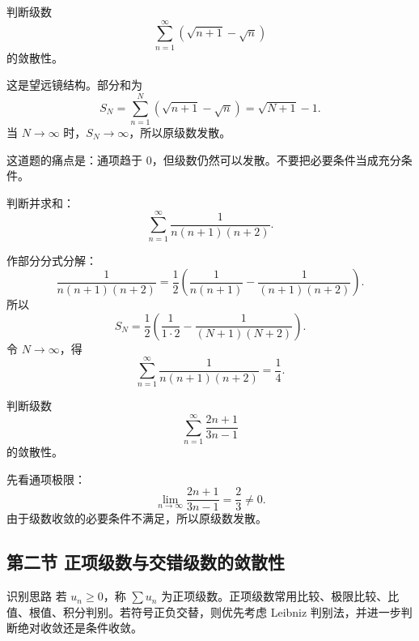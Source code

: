 \begin{problem}
判断级数
\[
  \sum_{n=1}^{\infty}\left(\sqrt{n+1}-\sqrt n\right)
\]
的敛散性。
\end{problem}
\begin{solution}
这是望远镜结构。部分和为
\[
  S_N=\sum_{n=1}^{N}\left(\sqrt{n+1}-\sqrt n\right)=\sqrt{N+1}-1.
\]
当 $N\to\infty$ 时，$S_N\to\infty$，所以原级数发散。
\end{solution}
\begin{note}
这道题的痛点是：通项趋于 $0$，但级数仍然可以发散。不要把必要条件当成充分条件。
\end{note}

\begin{problem}
判断并求和：
\[
  \sum_{n=1}^{\infty}\frac1{n(n+1)(n+2)}.
\]
\end{problem}
\begin{solution}
作部分分式分解：
\[
  \frac1{n(n+1)(n+2)}
  =\frac12\left(\frac1{n(n+1)}-\frac1{(n+1)(n+2)}\right).
\]
所以
\[
  S_N=\frac12\left(\frac1{1\cdot2}-\frac1{(N+1)(N+2)}\right).
\]
令 $N\to\infty$，得
\[
  \sum_{n=1}^{\infty}\frac1{n(n+1)(n+2)}=\frac14.
\]
\end{solution}

\begin{problem}
判断级数
\[
  \sum_{n=1}^{\infty}\frac{2n+1}{3n-1}
\]
的敛散性。
\end{problem}
\begin{solution}
先看通项极限：
\[
  \lim_{n\to\infty}\frac{2n+1}{3n-1}=\frac23\ne0.
\]
由于级数收敛的必要条件不满足，所以原级数发散。
\end{solution}

\subsection{第二节 正项级数与交错级数的敛散性}

\begin{summarybox}{识别思路}
若 $u_n\ge0$，称 $\sum u_n$ 为正项级数。正项级数常用比较、极限比较、比值、根值、积分判别。若符号正负交替，则优先考虑 Leibniz 判别法，并进一步判断绝对收敛还是条件收敛。
\end{summarybox}

